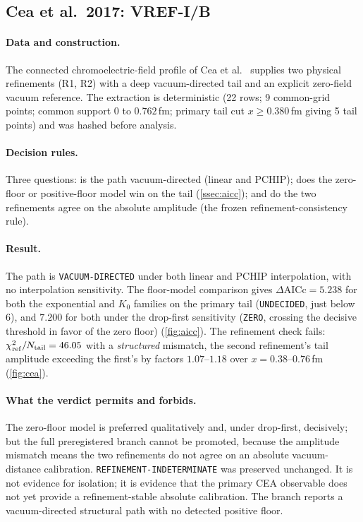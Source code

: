 \documentclass[11pt,a4paper]{article}
\theoremstyle{definition}
\theoremstyle{remark}
\begin{document}
\subsection{Cea et al.\ 2017: VREF-I/B}\label{ssec:cea}
\paragraph{Data and construction.} The connected chromoelectric-field profile of Cea et al.\ \cite{Cea17} supplies two physical refinements (R1, R2) with a deep vacuum-directed tail and an explicit zero-field vacuum reference. The extraction is deterministic (22 rows; 9 common-grid points; common support $0$ to $0.762$\,fm; primary tail cut $x\ge0.380$\,fm giving 5 tail points) and was hashed before analysis.
\paragraph{Decision rules.} Three questions: is the path vacuum-directed (linear and PCHIP); does the zero-floor or positive-floor model win on the tail (\cref{ssec:aicc}); and do the two refinements agree on the absolute amplitude (the frozen refinement-consistency rule).
\paragraph{Result.} The path is \texttt{VACUUM-\allowbreak{}DIRECTED} under both linear and PCHIP interpolation, with no interpolation sensitivity. The floor-model comparison gives $\Delta\mathrm{AICc}=5.238$ for both the exponential and $K_0$ families on the primary tail (\texttt{UNDECIDED}, just below $6$), and $7.200$ for both under the drop-first sensitivity (\texttt{ZERO}, crossing the decisive threshold in favor of the zero floor) (\cref{fig:aicc}). The refinement check fails: $\chi^2_{\rm ref}/N_{\rm tail}=46.05$ with a \emph{structured} mismatch, the second refinement's tail amplitude exceeding the first's by factors $1.07$--$1.18$ over $x=0.38$--$0.76$\,fm (\cref{fig:cea}).
\paragraph{What the verdict permits and forbids.} The zero-floor model is preferred qualitatively and, under drop-first, decisively; but the full preregistered branch cannot be promoted, because the amplitude mismatch means the two refinements do not agree on an absolute vacuum-distance calibration. \texttt{REFINEMENT-\allowbreak{}INDETERMINATE} was preserved unchanged. It is not evidence for isolation; it is evidence that the primary CEA observable does not yet provide a refinement-stable absolute calibration. The branch reports a vacuum-directed structural path with no detected positive floor.
\end{document}
